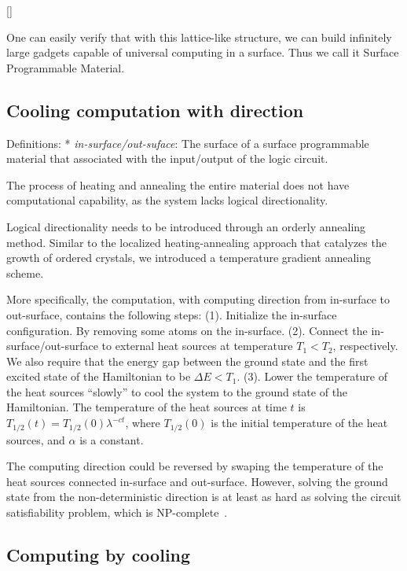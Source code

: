 \documentclass[twocolumn,superscriptaddress,english,showpacs,longbibliography]{revtex4-2}
\newcommand{\jgl}[1]{[{\color{green}{JGL: #1}}]}
\begin{document}
\jgl{We need a main figure to show the tiling and cooling.}

One can easily verify that with this lattice-like structure, we can
build infinitely large gadgets capable of universal computing in a
surface. Thus we call it Surface Programmable Material.

\subsection{Cooling computation with direction}\label{sec:direction}

Definitions: * \emph{in-surface/out-suface}: The surface of a surface
programmable material that associated with the input/output of the logic
circuit.

The process of heating and annealing the entire material does not have computational capability, as the system lacks logical directionality.

Logical directionality needs to be introduced through an orderly annealing method. 
Similar to the localized heating-annealing approach that catalyzes the growth of ordered crystals, we introduced a temperature gradient annealing scheme.

More specifically, the computation, with computing direction from in-surface to out-surface, contains the following steps: (1). Initialize the in-surface configuration. By removing
some atoms on the in-surface. (2). Connect the in-surface/out-surface to
external heat sources at temperature $T_1 < T_2$, respectively. We
also require that the energy gap between the ground state and the first
excited state of the Hamiltonian to be $\Delta E< T_1$. (3). Lower the
temperature of the heat sources ``slowly'' to cool the system to the
ground state of the Hamiltonian. The temperature of the heat sources at
time $t$ is $T_{1/2}(t) = T_{1/2}(0)\lambda^{-c t}$, where
$T_{1/2}(0)$ is the initial temperature of the heat sources, and
$\alpha$ is a constant.

The computing direction could be reversed by swaping the temperature of the heat sources connected in-surface and out-surface.
However, solving the ground state from the non-deterministic direction is at least as hard as solving the circuit satisfiability problem, which is NP-complete~\cite{Moore2011}.

\subsection{Computing by cooling}\label{local-cooling}
\end{document}
